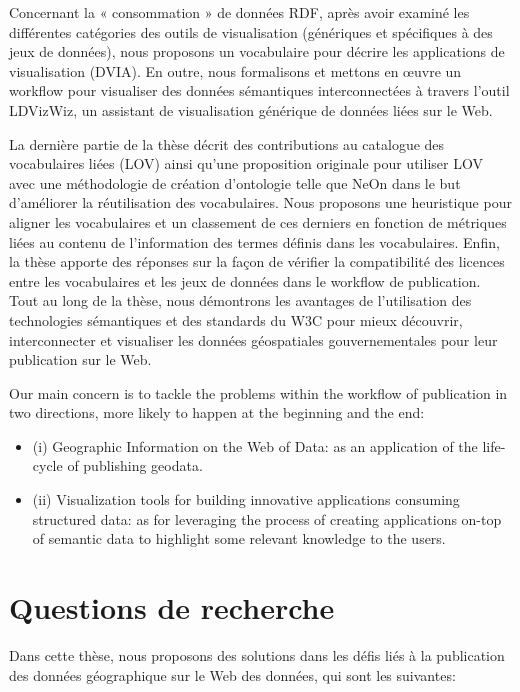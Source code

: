 \documentclass[a4paper,11pt,twoside]{report}
\begin{document}
Concernant la « consommation » de données RDF, après avoir examiné les différentes catégories des outils de visualisation (génériques et spécifiques à des jeux de données), nous proposons un vocabulaire pour décrire les applications de visualisation (DVIA). En outre, nous formalisons et mettons en œuvre un workflow pour visualiser des données sémantiques interconnectées à travers l'outil LDVizWiz, un assistant de visualisation générique de données liées sur le Web. 

La dernière partie de la thèse décrit des contributions au catalogue des vocabulaires liées (LOV) ainsi qu'une proposition originale pour utiliser LOV avec une méthodologie de création d'ontologie telle que NeOn dans le but d'améliorer la réutilisation des vocabulaires. Nous proposons une heuristique pour aligner les vocabulaires et un classement de ces derniers en fonction de métriques liées au contenu de l'information des termes définis dans les vocabulaires. Enfin, la thèse apporte des réponses sur la façon de vérifier la compatibilité des licences entre les vocabulaires et les jeux de données dans le workflow de publication. Tout au long de la thèse, nous démontrons les avantages de l'utilisation des technologies sémantiques et des standards du W3C pour mieux découvrir, interconnecter et visualiser les données géospatiales gouvernementales pour leur publication sur le Web.

Our main concern is to tackle the problems within the workflow of publication in two directions, more likely to happen at the beginning and the end: 
\begin{itemize}
\item (i) Geographic Information on the Web of Data: as an application of the life-cycle of publishing geodata.
\item (ii) Visualization tools for building innovative applications consuming structured data: as for leveraging the process of creating applications on-top of semantic data to highlight some relevant knowledge to the users.

\end{itemize}


\chapter*{Questions de recherche}

Dans cette thèse, nous proposons des solutions dans les défis liés à la publication des données géographique sur le Web des données, qui sont les suivantes: 
\end{document}
